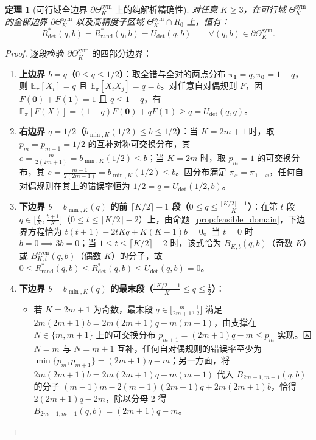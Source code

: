 \documentclass[11pt,a4paper]{article}
\newtheorem{theorem}{定理}[section]
\theoremstyle{definition}
\theoremstyle{remark}
\newcommand{\Rdet}{R^*_{\mathrm{det}}}
\newcommand{\Rrand}{R^*_{\mathrm{rand}}}
\newcommand{\Thetasym}{\Theta^{\mathrm{sym}}_K}
\begin{document}
\begin{theorem}[可行域全边界 $\partial\Thetasym$ 上的纯解析精确性]\label{thm:boundary}
对任意 $K \ge 3$，在可行域 $\Thetasym$ 的全部边界 $\partial\Thetasym$ 以及高精度子区域 $\Thetasym \cap R_0$ 上，恒有：
\begin{equation}\label{eq:boundary_exact}
  \boxed{\Rdet(q, b) = \Rrand(q, b) = U_{\mathrm{det}}(q, b) \qquad \forall (q, b) \in \partial\Thetasym.}
\end{equation}
\end{theorem}
\begin{proof}
逐段检验 $\partial\Thetasym$ 的四部分边界：
\begin{enumerate}
  \setlength{\itemsep}{2pt}\setlength{\parskip}{0pt}
  \item \textbf{上边界 $b = q$（$0 \le q \le 1/2$）}：取全错与全对的两点分布 $\pi_{\mathbf{1}} = q, \pi_{\mathbf{0}} = 1 - q$，则 $\mathbb{E}_\pi[X_i] = q$ 且 $\mathbb{E}_\pi[X_i X_j] = q = b$。对任意自对偶规则 $F$，因 $F(\mathbf{0}) + F(\mathbf{1}) = 1$ 且 $q \le 1 - q$，有 $\mathbb{E}_\pi[F(X)] = (1-q)F(\mathbf{0}) + qF(\mathbf{1}) \ge q = U_{\mathrm{det}}(q, q)$。
  \item \textbf{右边界 $q = 1/2$（$b_{\min, K}(1/2) \le b \le 1/2$）}：当 $K = 2m+1$ 时，取 $p_m = p_{m+1} = 1/2$ 的互补对称可交换分布，其 $e = \frac{m}{2(2m+1)} = b_{\min, K}(1/2) \le b$；当 $K = 2m$ 时，取 $p_m = 1$ 的可交换分布，其 $e = \frac{m-1}{2(2m-1)} = b_{\min, K}(1/2) \le b$。因分布满足 $\pi_x = \pi_{\mathbf{1}-x}$，任何自对偶规则在其上的错误率恒为 $1/2 = q = U_{\mathrm{det}}(1/2, b)$。
  \item \textbf{下边界 $b = b_{\min, K}(q)$ 的前 $\lceil K/2 \rceil - 1$ 段（$0 \le q \le \frac{\lceil K/2 \rceil - 1}{K}$）}：在第 $t$ 段 $q \in \bigl[\frac{t}{K}, \frac{t+1}{K}\bigr]$（$0 \le t \le \lceil K/2 \rceil - 2$）上，由命题~\ref{prop:feasible_domain}，下边界方程恰为 $t(t+1) - 2tKq + K(K-1)b = 0$。当 $t = 0$ 时 $b = 0 \implies 3b = 0$；当 $1 \le t \le \lceil K/2 \rceil - 2$ 时，该式恰为 $B_{K, t}(q, b)$（奇数 $K$）或 $B^{\mathrm{even}}_{K, t}(q, b)$（偶数 $K$）的分子，故 $0 \le \Rrand(q,b) \le \Rdet(q,b) \le U_{\mathrm{det}}(q,b) = 0$。
  \item \textbf{下边界 $b = b_{\min, K}(q)$ 的最末段（$\frac{\lceil K/2 \rceil - 1}{K} \le q \le \frac{1}{2}$）}：
  \begin{itemize}
    \item 若 $K = 2m+1$ 为奇数，最末段 $q \in \bigl[\frac{m}{2m+1}, \frac{1}{2}\bigr]$ 满足 $2m(2m+1)b = 2m(2m+1)q - m(m+1)$，由支撑在 $N \in \{m, m+1\}$ 上的可交换分布 $p_{m+1} = (2m+1)q - m \le p_m$ 实现。因 $N=m$ 与 $N=m+1$ 互补，任何自对偶规则的错误率至少为 $\min\{p_m, p_{m+1}\} = (2m+1)q - m$；另一方面，将 $2m(2m+1)b = 2m(2m+1)q - m(m+1)$ 代入 $B_{2m+1, m-1}(q, b)$ 的分子 $(m-1)m - 2(m-1)(2m+1)q + 2m(2m+1)b$，恰得 $2(2m+1)q - 2m$，除以分母 $2$ 得 $B_{2m+1, m-1}(q, b) = (2m+1)q - m$。

\end{itemize}
\end{enumerate}
\end{proof}
\end{document}

